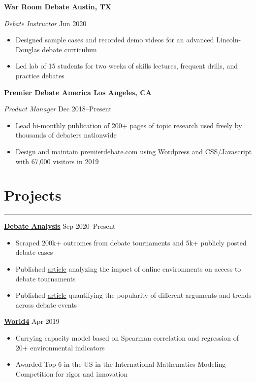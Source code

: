 \documentclass[11pt]{article}
\newcommand{\resumesection}[1]{\vspace{-0.6cm}\section*{\color{highlight}#1}\vspace{-0.3cm}\hrule\vspace{0.2cm}}
\begin{document}
\textbf{War Room Debate \hfill Austin, TX} \par
\textit{Debate Instructor}  \hfill Jun 2020 \par
\begin{itemize}
	\item Designed sample cases and recorded demo videos for an advanced Lincoln-Douglas debate curriculum
	\item Led lab of 15 students for two weeks of skills lectures, frequent drills, and practice debates
\end{itemize}\vspace{0.1cm}

\textbf{Premier Debate America \hfill  Los Angeles, CA} \par
\textit{Product Manager} \hfill Dec 2018--Present \par
\begin{itemize}
	\item Lead bi-monthly publication of 200+ pages of topic research used freely by thousands of debaters nationwide
	\item Design and maintain \href{https://www.premierdebate.com/briefs/}{premierdebate.com} using Wordpress and CSS/Javascript with 67,000 visitors in 2019
\end{itemize}


\resumesection{Projects}

\textbf{\href{https://github.com/petezh/E-Debate}{Debate Analysis}} \hfill Sep 2020--Present\par
\begin{itemize}
	\item Scraped 200k+ outcomes from debate tournaments and 5k+ publicly posted debate cases
	\item Published \href{https://www.vbriefly.com/2020/12/31/five-trends-among-e-debate-competitors-by-peter-zhang/}{article} analyzing the impact of online environments on access to debate tournaments
	\item Published \href{https://www.vbriefly.com/2021/01/22/disclosure-in-numbers-by-peter-zhang/}{article} quantifying the popularity of different arguments and trends across debate events
\end{itemize}\vspace{0.1cm} \par

\textbf{\href{https://github.com/gautomdas/IMMC-World4/blob/master/US-9365.pdf}{World4}} \hfill Apr 2019\par
\begin{itemize}
	\item Carrying capacity model based on Spearman correlation and regression of 20+ environmental indicators
	\item Awarded Top 6 in the US in the International Mathematics Modeling Competition for rigor and innovation
\end{itemize}\vspace{0.1cm} \par
\end{document}
